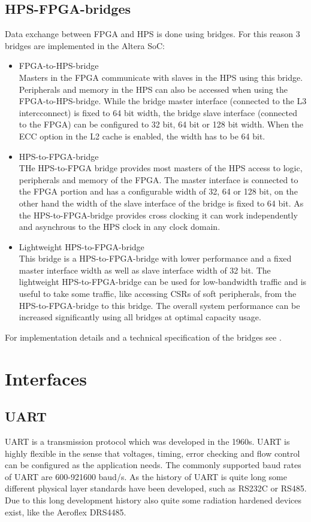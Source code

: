 \subsection{HPS-FPGA-bridges}
Data exchange between FPGA and HPS is done using bridges. For this reason 3 bridges are implemented in the Altera SoC:
\begin{itemize}
\item FPGA-to-HPS-bridge\\
Masters in the FPGA communicate with slaves in the HPS using this bridge. Peripherals and memory in the HPS can also be accessed when using the FPGA-to-HPS-bridge. While the bridge master interface (connected to the L3 intercconnect)  is fixed to 64 bit width, the bridge slave interface (connected to the FPGA) can be configured to 32 bit, 64 bit or 128 bit width. When the ECC option in the L2 cache is enabled, the width has to be 64 bit. 
\item HPS-to-FPGA-bridge\\
THe HPS-to-FPGA bridge provides most masters of the HPS access to logic, peripherals and memory of the FPGA. The master interface is connected to the FPGA portion and has a configurable width of 32, 64 or 128 bit, on the other hand the width of the slave interface of the bridge is fixed to 64 bit. As the HPS-to-FPGA-bridge provides cross clocking it can work independently and asynchrous to the HPS clock in any clock domain. 
\item Lightweight HPS-to-FPGA-bridge\\
This bridge is a HPS-to-FPGA-bridge with lower performance and a fixed master interface width as well as slave interface width of 32 bit. The lightweight HPS-to-FPGA-bridge can be used for low-bandwidth traffic and is useful to take some traffic, like accessing CSRs of soft peripherals, from the HPS-to-FPGA-bridge to this bridge. The overall system performance can be increased significantly using all bridges at optimal capacity usage.
\end{itemize}
For implementation details and a technical specification of the bridges see \cite[chapter 8]{AlteraHPS15}.
\section{Interfaces}
\subsection{UART}
UART is a transmission protocol which was developed in the 1960s. UART is highly flexible in the sense that voltages, timing, error checking and flow control can be configured as the application needs. The commonly supported baud rates of UART are 600-921600 baud/s. As the history of UART is quite long some different physical layer standards have been developed, such as RS232C or RS485. Due to this long development history also quite some radiation hardened devices exist, like the Aeroflex DRS4485.\cite{aeroflex14}
